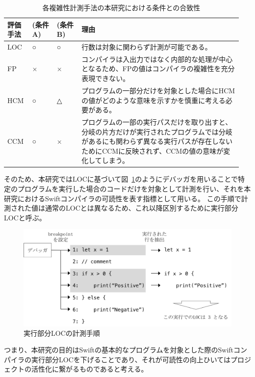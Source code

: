 \begin{table}[!hbtp]
    \begin{center}
        \caption{各複雑性計測手法の本研究における条件との合致性}
        \begin{tabular}{|p{0.1\linewidth}|p{0.1\linewidth}|p{0.1\linewidth}|p{0.65\linewidth}|}
            \hline
            評価手法 & (条件A) & (条件B) & 理由\\
            \hline
            \hline
            LOC & ○ & ○ & 行数は対象に関わらず計測が可能である。\\
            \hline
            FP & × & × & コンパイラは入出力ではなく内部的な処理が中心となるため、FPの値はコンパイラの複雑性を充分表現できない。 \\
            \hline
            HCM & ○ & △ & プログラムの一部分だけを対象とした場合にHCMの値がどのような意味を示すかを慎重に考える必要がある。\\
            \hline
            CCM & ○ & × & プログラムの一部の実行パスだけを取り出すと、分岐の片方だけが実行されたプログラムでは分岐があるにも関わらず異なる実行パスが存在しないためにCCMに反映されず、CCMの値の意味が変化してしまう。\\
            \hline
        \end{tabular}
        \label{table:evaluation-property}
    \end{center}
\end{table}

そのため、本研究ではLOCに基づいて図~\ref{img:loc-measurement}のようにデバッガを用いることで特定のプログラムを実行した場合のコードだけを対象として計測を行い、それを本研究におけるSwiftコンパイラの可読性を表す指標として用いる。
この手順で計測された値は通常のLOCとは異なるため、これ以降区別するために実行部分LOCと呼ぶ。

\begin{figure}
    \begin{center}
        \includegraphics[scale=0.8]{./img/loc_measurement.png}
        \caption{実行部分LOCの計測手順}
        \label{img:loc-measurement}
    \end{center}
\end{figure}

つまり、本研究の目的はSwiftの基本的なプログラムを対象とした際のSwiftコンパイラの実行部分LOCを下げることであり、それが可読性の向上ひいてはプロジェクトの活性化に繋がるものであると考える。
